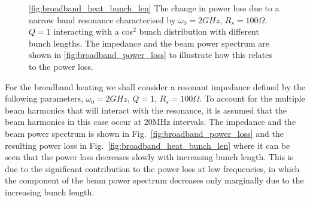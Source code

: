 \begin{figure}
\caption{\ref{fig:broadband_heat_bunch_len} The change in power loss due to a narrow band resonance characterised by $\omega_{0} = 2GHz$, $R_{s} = 100\Omega$, $Q = 1$ interacting with a cos$^{2}$ bunch distribution with different bunch lengths. The impedance and the beam power spectrum are shown in \ref{fig:broadband_power_loss} to illustrate how this relates to the power loss.}
\end{figure}


For the broadband heating we shall consider a resonant impedance defined by the following parameters, $\omega_{0} = 2GHz$, $Q=1$, $R_{s}=100\Omega$. To account for the multiple beam harmonics that will interact with the resonance, it is assumed that the beam harmonics in this case occur at $20$MHz intervals. The impedance and the beam power spectrum is shown in Fig.~\ref{fig:broadband_power_loss} and the resulting power loss in Fig.~\ref{fig:broadband_heat_bunch_len} where it can be seen that the power loss decreases slowly with increasing bunch length. This is due to the significant contribution to the power loss at low frequencies, in which the component of the beam power spectrum decreases only marginally due to the increasing bunch length.

